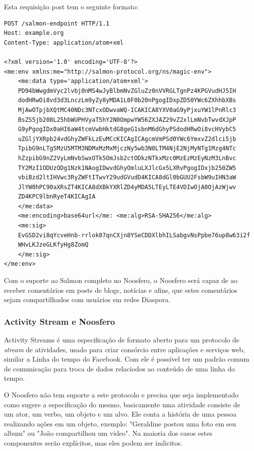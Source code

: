 \documentclass[12pt]{article}
\begin{document}
Esta requisição post tem o seguinte formato:

\begin{framed}
\begin{lstlisting}[caption=Exemplo requisição POST Salmon]
POST /salmon-endpoint HTTP/1.1
Host: example.org
Content-Type: application/atom+xml

<?xml version='1.0' encoding='UTF-8'?>
<me:env xmlns:me="http://salmon-protocol.org/ns/magic-env">
    <me:data type='application/atom+xml'>
    PD94bWwgdmVyc2lvbj0nMS4wJyBlbmNvZGluZz0nVVRGLTgnPz4KPGVudHJ5IH
    dodHRwOi8vd3d3LnczLm9yZy8yMDA1L0F0b20nPgogIDxpZD50YWc6ZXhhbXBs
    MjAwOTpjbXQtMC40NDc3NTcxODwvaWQ-ICAKICA8YXV0aG9yPjxuYW1lPnRlc3
    BsZS5jb208L25hbWUPHVyaT5hY2N0OmpwYW56ZXJAZ29vZ2xlLmNvbTwvdXJpP
    G9yPgogIDx0aHI6aW4tcmVwbHktdG8geG1sbnM6dGhyPSdodHRwOi8vcHVybC5
    uZGljYXRpb24vdGhyZWFkLzEuMCcKICAgICAgcmVmPSd0YWc6YmxvZ2dlci5jb
    TpibG9nLTg5MzU5MTM3NDMxMzMxMjczNy5wb3N0LTM4NjE2NjMyNTg1Mzg4NTc
    hZzpibG9nZ2VyLmNvbSwxOTk5OmJsb2ctODkzNTkxMzc0MzEzMzEyNzM3LnBvc
    TY2MzI1ODUzODg1Nzk1NAogIDwvdGhyOmluLXJlcGx5LXRvPgogIDxjb250ZW5
    vbiBzd2ltIHVwc3RyZWFtITwvY29udGVudD4KICA8dGl0bGUU2FsbW9uIHN3aW
    JlYW0hPC90aXRsZT4KICA8dXBkYXRlZD4yMDA5LTEyLTE4VDIwOjA0OjAzWjwv
    ZD4KPC9lbnRyeT4KICAgIA
    </me:data>
    <me:encoding>base64url</me: <me:alg>RSA-SHA256</me:alg>
    <me:sig>
    EvGSD2vi8qYcveHnb-rrlok07qnCXjn8YSeCDDXlbhILSabgvNsPpbe76up8w63i2f
    WHvLKJzeGLKfyHg8ZomQ
    </me:sig>
</me:env>
\end{lstlisting}
\end{framed}

Com o suporte ao Salmon completo no Noosfero, o Noosfero será capaz de ao
receber comentários em posts de blogs, notícias e afins, que estes comentários
sejam compartilhados com usuários em redes Diaspora.

\subsubsection{Activity Stream e Noosfero}

Activity Streams é uma especificação de formato aberto para um protocolo de
{\it stream} de atividades, usado para criar consórcio entre aplicações e
serviços web, similar a Linha do tempo do Facebook. Com ele é possível ter um
padrão comum de comunicação para troca de dados relaciodos ao conteúdo de uma
linha do tempo.

O Noosfero não tem suporte a este protocolo e precisa que seja implementado
como sugere a especificação do mesmo, basicamente uma atividade consiste de um
ator, um verbo, um objeto e um alvo. Ele conta a história de uma pessoa
realizando ações em um objeto, exemplo: "Geraldine postou uma foto em seu
album" ou "João compartilhou um video"\cite{streams}. Na maioria dos casos
estes componentes serão explícitos, mas eles podem ser imlicitos.
\end{document}
